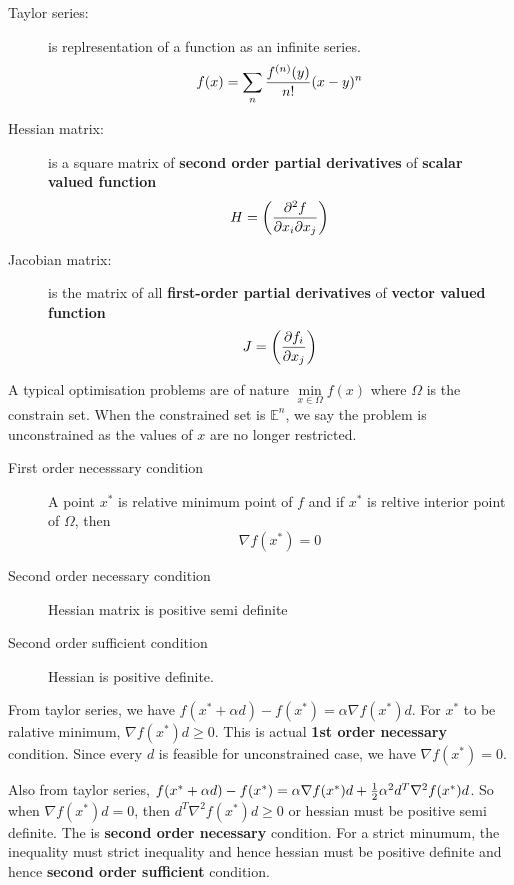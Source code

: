 \begin{slide}[Basics]
	\begin{description}
		\item[Taylor series:] is replresentation of a function as an infinite series.
			$$f(x) = \sum _n {f^{(n)}(y) \over n!} (x-y)^n$$
		\item[Hessian matrix:] is a  square matrix of \textbf{second order partial derivatives} of \textbf{scalar valued function} 
			$$H = \left({\partial^2f \over \partial x_i \partial x_j}\right)$$
		\item[Jacobian matrix:] is the matrix of all \textbf{first-order partial derivatives} of  \textbf{vector valued function}
			$$J = \left({\partial f_i \over \partial x_j}\right)$$
	\end{description}
\end{slide}
\begin{slide}
A typical optimisation problems are of nature $\min\limits_{x\in \Omega} f(x)$ where $\Omega$ is the constrain set. When the constrained set is $\mathbb{E}^n$, we say the problem is unconstrained as the values of $x$ are no longer restricted.
\begin{description}
	\item[First order necesssary condition] A point $x^{*}$ is relative minimum point of $f$ and if $x^*$ is reltive interior point of $\Omega$, then 
	$$\nabla f(x^*) = 0$$
	\item[Second order necessary condition]
		Hessian matrix is positive semi definite
	\item[Second order sufficient condition] Hessian is positive definite.
\end{description}
From taylor series, we have $f(x^*+\alpha d) - f(x^*) = \alpha \nabla f (x^*) d$. For $x^*$ to be ralative minimum, $\nabla f(x^*) d \geq 0$. This is actual \textbf{1st order necessary} condition. Since every $d$ is feasible for unconstrained case, we have $\nabla f(x^*) = 0$.

\quad Also from taylor series, $f(x^*+\alpha d) - f(x^*) = \alpha \nabla f (x^*) d + {1\over 2} \alpha^2 d^T\nabla^2f(x^*)d$. So when $\nabla f(x^*) d = 0$, then $d^T\nabla^2f(x^*)d \geq 0$ or hessian must be positive semi definite. The is \textbf{second order necessary} condition. For a strict minumum, the inequality must strict inequality and hence hessian must be positive definite and hence \textbf{second order sufficient} condition.
\end{slide}
